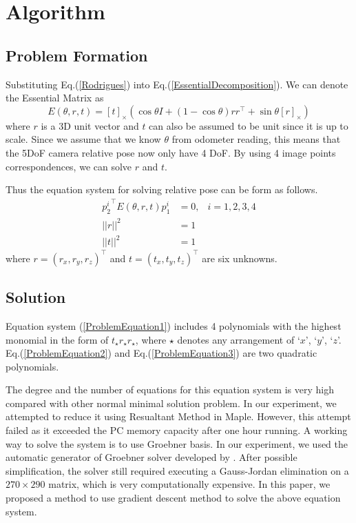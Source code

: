 \documentclass[letterpaper, 10 pt, conference]{ieeeconf}
\begin{document}
\section{Algorithm}
\label{Algorithm}

\subsection{Problem Formation}
Substituting Eq.(\ref{Rodrigues}) into Eq.(\ref{EssentialDecomposition}). We can denote the Essential Matrix as 
\begin{equation}
E(\theta, r, t) = [t]_\times \left( \cos \theta I + (1 - \cos \theta) r r^\top + \sin \theta [ r ]_\times \right)
\end{equation}
where $r$ is a 3D unit vector and $t$ can also be assumed to be unit since it is up to scale. Since we assume that we know $\theta$ from odometer reading, this means that the 5DoF camera relative pose now only have 4 DoF. By using 4 image points correspondences, we can solve $r$ and $t$. 

Thus the equation system for solving relative pose can be form as follows. 
\begin{eqnarray}
\label{ProblemEquation1}
{p_2^i}^\top E(\theta, r, t) p_1^i & = 0,& i = 1, 2, 3, 4 \\
\label{ProblemEquation2}
|| r ||^2 & = 1 & \\
\label{ProblemEquation3}
|| t ||^2 & = 1 &
\end{eqnarray}
where $r = (r_x, r_y, r_z)^\top$ and $t = (t_x, t_y, t_z)^\top$ are six unknowns. 

\subsection{Solution}
\label{Solution}
Equation system (\ref{ProblemEquation1}) includes 4 polynomials with the highest monomial in the form of $t_\star r_\star r_\star$, where $\star$ denotes any arrangement of `$x$', `$y$', `$z$'. Eq.(\ref{ProblemEquation2}) and Eq.(\ref{ProblemEquation3}) are two quadratic polynomials. 

The degree and the number of equations for this equation system is very high  compared with other normal minimal solution problem. In our experiment, we attempted to reduce it using Resualtant Method in Maple. However, this attempt failed as it exceeded the PC memory capacity after one hour running. A working way to solve the system is to use Groebner basis. In our experiment, we used the automatic generator of Groebner solver developed by \cite{kukelova2008automatic}. After possible simplification, the solver still required executing a Gauss-Jordan elimination on a $270 \times 290$ matrix, which is very computationally expensive. In this paper, we proposed a method to use gradient descent method to solve the above equation system. 
\end{document}
